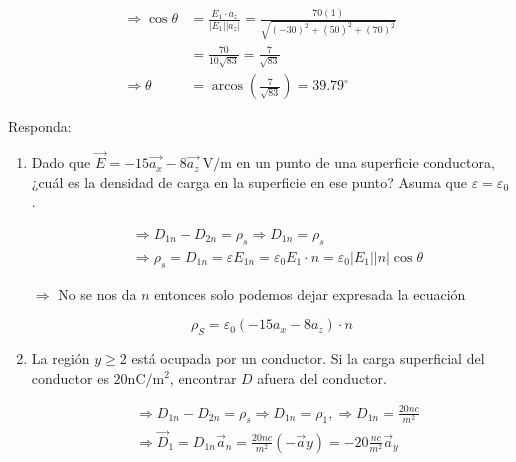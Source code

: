 \begin{problema}
\begin{enumerate}
\begin{sol}
            $$
            \begin{aligned}
            \Rightarrow \cos \theta & =\frac{E_{1} \cdot a_{z}}{\left|E_{1}\right|\left|a_{z}\right|}=\frac{70(1)}{\sqrt{(-30)^{2}+(50)^{2}+(70)^2}} \\
            & =\frac{70}{10 \sqrt{83}}=\frac{7}{\sqrt{83}} \\
            \Rightarrow \theta & =\operatorname{arcos}\left(\frac{7}{\sqrt{83}}\right)=39.79^{\circ}
            \end{aligned}
            $$
        \end{sol}
    \end{enumerate}
    
    

\end{problema}


\begin{problema}
Responda:
\begin{enumerate}
    \item Dado que $\vec{E}=-15 \overrightarrow{a_{x}}-8 \overrightarrow{a_{z}} \mathrm{~V} / \mathrm{m}$ en un punto de una superficie conductora, ¿cuál es la densidad de carga en la superficie en ese punto? Asuma que $\varepsilon=\varepsilon_{0}$.
    \begin{sol}
        $$
\begin{aligned}
& \Rightarrow D_{1 n}-D_{2 n}=\rho_{s} \Rightarrow D_{1 n}=\rho_{s} \\
& \Rightarrow \rho_{s}=D_{1 n}=\varepsilon E_{1 n}=\varepsilon_{0} E_{1} \cdot n=\varepsilon_0\left|E_{1}\right||n| \cos \theta
\end{aligned}
$$

$\Rightarrow$ No se nos da $n$ entonces solo podemos dejar expresada la ecuación

$$
\rho_{S}=\varepsilon_{0}\left(-15 a_{x}-8 a_{z}\right) \cdot n
$$
    \end{sol}
    \item La región $y \geq 2$ está ocupada por un conductor. Si la carga superficial del conductor es $20 \mathrm{nC} / \mathrm{m}^{2}$, encontrar $D$ afuera del conductor.
    \begin{sol}
        $$
\begin{aligned}
& \Rightarrow D_{1 n}-D_{2 n}=\rho_{s} \Rightarrow D_{1 n}=\rho_{1}, \Rightarrow D_{1 n}=\frac{20 n c}{m^{2}} \\
& \Rightarrow \vec{D}_{1}=D_{1 n} \vec{a}_{n}=\frac{20 n c}{m^{2}}(-\vec{a} y)=-20 \frac{nc}{m^2}\vec{a}_y
\end{aligned}
$$
    \end{sol}
\end{enumerate}


\end{problema}

